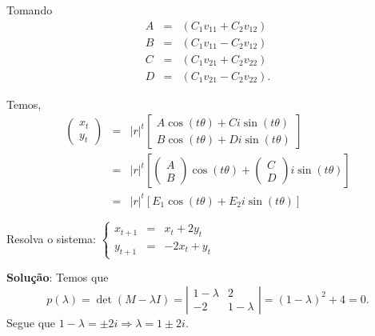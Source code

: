 Tomando
$$\begin{array}{rcl}
A &=& (C_1v_{11} + C_2v_{12}) \\
B &=& (C_1v_{11} - C_2v_{12}) \\
C &=& (C_1v_{21} + C_2v_{22}) \\
D &=& (C_1v_{21} - C_2v_{22}).
\end{array}$$

Temos,
$$\begin{array}{rcl}
\left(\begin{array}{c} x_{t} \\ y_{t} \end{array}\right)
&=& |r|^t \left[\begin{array}{c}
A \cos(t\theta) + C i \sin(t\theta) \\
B \cos(t\theta) + D i \sin(t\theta) 
\end{array}\right] \\
&=& |r|^t \left[
\left(\begin{array}{c} A \\ B \end{array}\right) \cos(t\theta)
+
\left(\begin{array}{c} C \\ D \end{array}\right) i\sin(t\theta)
\right] \\
&=& |r|^t \left[
E_1 \cos(t\theta)
+
E_2 i\sin(t\theta)
\right]
\end{array}$$



\begin{example}
Resolva o sistema:
$\left\{\begin{array}{rcl}
x_{t+1} &=& x_{t} + 2y_{t} \\
y_{t+1} &=& -2x_{t} + y_{t}
\end{array}\right.$
\end{example}

\textbf{Solução}: Temos que
$$
p(\lambda)
= \det(M - \lambda I)
= \left|\begin{array}{cc} 1-\lambda & 2 \\ -2 & 1-\lambda \end{array}\right| 
= (1-\lambda)^2 +4 = 0.$$
Segue que $1-\lambda = \pm 2i \Rightarrow  \lambda = 1 \pm 2i$.


